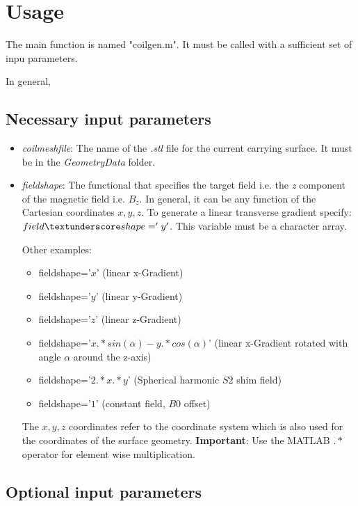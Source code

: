 \documentclass[a4paper,12pt]{book}
\begin{document}
\section{Usage}
The main function is named "coilgen.m". It must be called with a sufficient set of inpu parameters. 

In general, 

\subsection{Necessary input parameters}

\begin{itemize}
\item  \textit{coil\textunderscore mesh\textunderscore file}: The name of the \textit{.stl} file for the current carrying surface.  It must be in the\textit{ Geometry\textunderscore Data} folder.
\item  \textit{field\textunderscore shape}: The functional that specifies the target field i.e. the \textit{z} component of the magnetic field i.e. $B_{z}$. In general, it can be any function of the Cartesian coordinates $x,y,z$. To generate a linear transverse gradient specify: $field\textunderscore shape='y'$. This variable must be a character array. 

Other examples: 
\begin{itemize}
	\item  field\textunderscore shape='$x$' (linear x-Gradient)
	\item  field\textunderscore shape='$y$' (linear y-Gradient)
	\item  field\textunderscore shape='$z$' (linear z-Gradient)
	\item  field\textunderscore shape='$x.*sin(\alpha)-y.*cos(\alpha)$' (linear x-Gradient rotated with angle $\alpha$ around the z-axis)
	\item  field\textunderscore shape='$2.*x.*y$' (Spherical harmonic $S2$ shim field)
	\item  field\textunderscore shape='$1$' (constant field,  $B0$ offset)
\end{itemize}

The $x,y,z$ coordinates refer to the coordinate system which is also used for the coordinates of the surface geometry.
\textbf{Important}: Use the MATLAB $.*$ operator for element wise multiplication.

\end{itemize}

\subsection{Optional input parameters}
\end{document}
